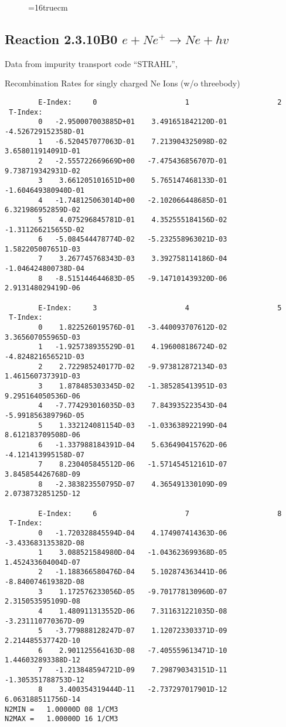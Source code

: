 \documentclass[12pt,dvipdfmx]{article}
\begin{document}
\begin{figure} \label{2.3.8A0}
\epsfxsize=16truecm 
\end{figure}
\newpage
\subsection{
Reaction 2.3.10B0   $e + Ne^+ \rightarrow  Ne + hv$ }

Data from impurity transport code ``STRAHL'', \cite{kn:Behringer}

  Recombination Rates for singly charged Ne Ions (w/o threebody)



\begin{small}\begin{verbatim}
        E-Index:     0                     1                     2
 T-Index:
        0   -2.950007003885D+01    3.491651842120D-01   -4.526729152358D-01
        1   -6.520457077063D-01    7.213904325098D-02    3.658011914091D-01
        2   -2.555722669669D+00   -7.475436856707D-01    9.738719342931D-02
        3    3.661205101651D+00    5.765147468133D-01   -1.604649380940D-01
        4   -1.748125063014D+00   -2.102066448685D-01    6.321986952859D-02
        5    4.075296845781D-01    4.352555184156D-02   -1.311266215655D-02
        6   -5.084544478774D-02   -5.232558963021D-03    1.582205007651D-03
        7    3.267745768343D-03    3.392758114186D-04   -1.046424800738D-04
        8   -8.515144644683D-05   -9.147101439320D-06    2.913148029419D-06

        E-Index:     3                     4                     5
 T-Index:
        0    1.822526019576D-01   -3.440093707612D-02    3.365607055965D-03
        1   -1.925738935529D-01    4.196008186724D-02   -4.824821656521D-03
        2    2.722985240177D-02   -9.973812872134D-03    1.461560737391D-03
        3    1.878485303345D-02   -1.385285413951D-03    9.295164050536D-06
        4   -7.774293016035D-03    7.843935223543D-04   -5.991856389796D-05
        5    1.332124081154D-03   -1.033638922199D-04    8.612183709508D-06
        6   -1.337988184391D-04    5.636490415762D-06   -4.121413995158D-07
        7    8.230405845512D-06   -1.571454512161D-07    3.845854426768D-09
        8   -2.383823550795D-07    4.365491330109D-09    2.073873285125D-12

        E-Index:     6                     7                     8
 T-Index:
        0   -1.720328845594D-04    4.174907414363D-06   -3.433683135382D-08
        1    3.088521584980D-04   -1.043623699368D-05    1.452433604004D-07
        2   -1.188366580476D-04    5.102874363441D-06   -8.840074619382D-08
        3    1.172576233056D-05   -9.701778130960D-07    2.315053595109D-08
        4    1.480911313552D-06    7.311631221035D-08   -3.231110770367D-09
        5   -3.779888128247D-07    1.120723303371D-09    2.214485537742D-10
        6    2.901125564163D-08   -7.405559613471D-10    1.446032893388D-12
        7   -1.213848594721D-09    7.298790343151D-11   -1.305351788753D-12
        8    3.400354319444D-11   -2.737297017901D-12    6.063188511756D-14
N2MIN =   1.00000D 08 1/CM3
N2MAX =   1.00000D 16 1/CM3


\end{verbatim}
\end{small}
\end{document}
